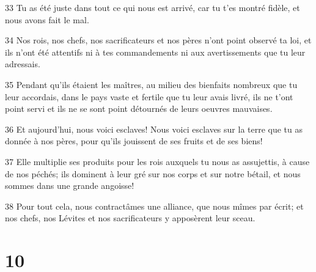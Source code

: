 \par 33 Tu as été juste dans tout ce qui nous est arrivé, car tu t'es montré fidèle, et nous avons fait le mal.
\par 34 Nos rois, nos chefs, nos sacrificateurs et nos pères n'ont point observé ta loi, et ils n'ont été attentifs ni à tes commandements ni aux avertissements que tu leur adressais.
\par 35 Pendant qu'ils étaient les maîtres, au milieu des bienfaits nombreux que tu leur accordais, dans le pays vaste et fertile que tu leur avais livré, ils ne t'ont point servi et ils ne se sont point détournés de leurs oeuvres mauvaises.
\par 36 Et aujourd'hui, nous voici esclaves! Nous voici esclaves sur la terre que tu as donnée à nos pères, pour qu'ils jouissent de ses fruits et de ses biens!
\par 37 Elle multiplie ses produits pour les rois auxquels tu nous as assujettis, à cause de nos péchés; ils dominent à leur gré sur nos corps et sur notre bétail, et nous sommes dans une grande angoisse!
\par 38 Pour tout cela, nous contractâmes une alliance, que nous mîmes par écrit; et nos chefs, nos Lévites et nos sacrificateurs y apposèrent leur sceau.

\chapter{10}

